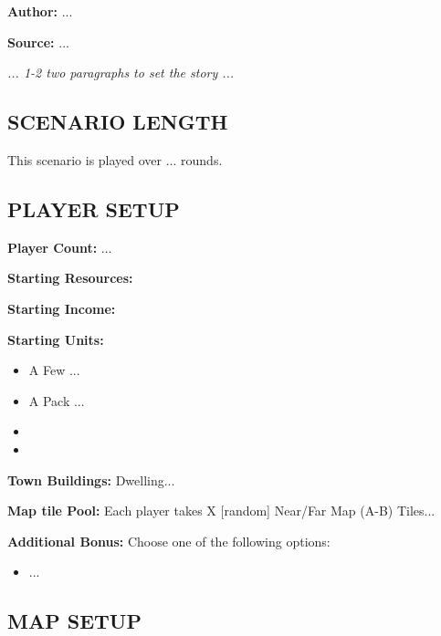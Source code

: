 
\begin{multicols*}{2}

\textbf{Author:} ...

\textbf{Source:} ...

\textit{... 1-2 two paragraphs to set the story ...}

\subsection*{\MakeUppercase{Scenario Length}}

This scenario is played over ... rounds.

\subsection*{\MakeUppercase{Player Setup}}

\textbf{Player Count:} ...

\textbf{Starting Resources:}\par
{}

\textbf{Starting Income:}\par
{}

\textbf{Starting Units:}
\begin{itemize}
  \item A Few ...
  \item A Pack ...
  \item {}
  \item {}
\end{itemize}

\textbf{Town Buildings:}  Dwelling...

\textbf{Map tile Pool:} Each player takes X [random] Near/Far Map (A-B) Tiles...

\textbf{Additional Bonus:} Choose one of the following options:

\begin{itemize}
    \item ...
\end{itemize}

\subsection*{\MakeUppercase{Map Setup}}


\end{multicols*}

